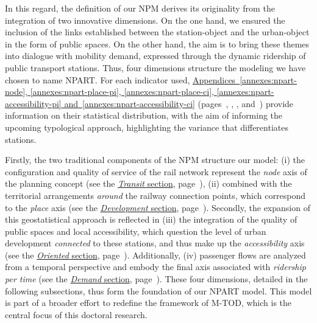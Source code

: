 \begin{refsegment}
In this regard, the definition of our \acrshort{NPM} derives its originality from the integration of two innovative dimensions. On the one hand, we ensured the inclusion of the links established between the station-object and the urban-object in the form of public spaces. On the other hand, the aim is to bring these themes into dialogue with mobility demand, expressed through the dynamic ridership of public transport stations. Thus, four dimensions structure the modeling we have chosen to name \acrfull{NPART}. For each indicator used, \hyperref[annexes:npart-node]{Appendices~\ref{annexes:npart-node}, \ref{annexes:npart-place-pi}, \ref{annexes:npart-place-ci}, \ref{annexes:npart-accessibility-pi} and~\ref{annexes:npart-accessibility-ci}} (pages~\pageref{annexes:npart-node}, \pageref{annexes:npart-place-pi}, \pageref{annexes:npart-place-ci}, \pageref{annexes:npart-accessibility-pi} and~\pageref{annexes:npart-accessibility-ci}) provide information on their statistical distribution, with the aim of informing the upcoming typological approach, highlighting the variance that differentiates stations.%

Firstly, the two traditional components of the \acrshort{NPM} structure our model: (i) the configuration and quality of service of the rail network represent the \textsl{node} axis of the planning concept (see the \hyperref[chap6:methodologie-indicateurs-node]{\textsl{Transit} section}, page~\pageref{chap6:methodologie-indicateurs-node}), (ii) combined with the territorial arrangements \textsl{around} the railway connection points, which correspond to the \textsl{place} axis (see the \hyperref[chap6:methodologie-indicateurs-place]{\textsl{Development} section}, page~\pageref{chap6:methodologie-indicateurs-place}). Secondly, the expansion of this geostatistical approach is reflected in (iii) the integration of the quality of public spaces and local accessibility, which question the level of urban development \textsl{connected} to these stations, and thus make up the \textsl{accessibility} axis (see the \hyperref[chap6:methodologie-indicateurs-accessibility]{\textsl{Oriented} section}, page~\pageref{chap6:methodologie-indicateurs-accessibility}). Additionally, (iv) passenger flows are analyzed from a temporal perspective and embody the final axis associated with \textsl{ridership per time} (see the \hyperref[chap6:methodologie-indicateurs-frequentation]{\textsl{Demand} section}, page~\pageref{chap6:methodologie-indicateurs-frequentation}). These four dimensions, detailed in the following subsections, thus form the foundation of our \acrshort{NPART} model. This model is part of a broader effort to redefine the framework of \acrshort{M-TOD}, which is the central focus of this doctoral research.%


\end{refsegment}
